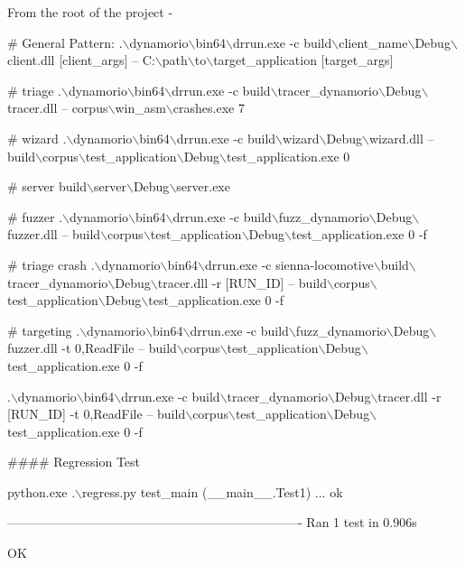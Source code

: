 From the root of the project -\/ 
\begin{DoxyCode}
# General Pattern:
.\(\backslash\)dynamorio\(\backslash\)bin64\(\backslash\)drrun.exe -c build\(\backslash\)client\_name\(\backslash\)Debug\(\backslash\)client.dll [client\_args] --
       C:\(\backslash\)path\(\backslash\)to\(\backslash\)target\_application [target\_args]

# triage
.\(\backslash\)dynamorio\(\backslash\)bin64\(\backslash\)drrun.exe -c build\(\backslash\)tracer\_dynamorio\(\backslash\)Debug\(\backslash\)tracer.dll -- corpus\(\backslash\)win\_asm\(\backslash\)crashes.exe 7

# wizard
.\(\backslash\)dynamorio\(\backslash\)bin64\(\backslash\)drrun.exe -c build\(\backslash\)wizard\(\backslash\)Debug\(\backslash\)wizard.dll --
       build\(\backslash\)corpus\(\backslash\)test\_application\(\backslash\)Debug\(\backslash\)test\_application.exe 0

# server
build\(\backslash\)server\(\backslash\)Debug\(\backslash\)server.exe

# fuzzer
.\(\backslash\)dynamorio\(\backslash\)bin64\(\backslash\)drrun.exe -c build\(\backslash\)fuzz\_dynamorio\(\backslash\)Debug\(\backslash\)fuzzer.dll --
       build\(\backslash\)corpus\(\backslash\)test\_application\(\backslash\)Debug\(\backslash\)test\_application.exe 0 -f

# triage crash
.\(\backslash\)dynamorio\(\backslash\)bin64\(\backslash\)drrun.exe -c sienna-locomotive\(\backslash\)build\(\backslash\)tracer\_dynamorio\(\backslash\)Debug\(\backslash\)tracer.dll -r [RUN\_ID] --
       build\(\backslash\)corpus\(\backslash\)test\_application\(\backslash\)Debug\(\backslash\)test\_application.exe 0 -f

# targeting
.\(\backslash\)dynamorio\(\backslash\)bin64\(\backslash\)drrun.exe -c build\(\backslash\)fuzz\_dynamorio\(\backslash\)Debug\(\backslash\)fuzzer.dll -t 0,ReadFile --
       build\(\backslash\)corpus\(\backslash\)test\_application\(\backslash\)Debug\(\backslash\)test\_application.exe 0 -f

.\(\backslash\)dynamorio\(\backslash\)bin64\(\backslash\)drrun.exe -c build\(\backslash\)tracer\_dynamorio\(\backslash\)Debug\(\backslash\)tracer.dll -r [RUN\_ID] -t 0,ReadFile --
       build\(\backslash\)corpus\(\backslash\)test\_application\(\backslash\)Debug\(\backslash\)test\_application.exe 0 -f
\end{DoxyCode}


\#\#\#\# Regression Test 
\begin{DoxyCode}
python.exe .\(\backslash\)regress.py
test\_main (\_\_main\_\_.Test1) ... ok

----------------------------------------------------------------------
Ran 1 test in 0.906s

OK
\end{DoxyCode}


